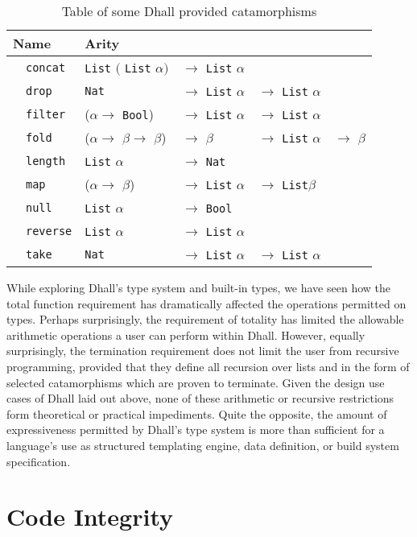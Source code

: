\documentclass[12pt]{diazessay}
\newcommand{\F}[1]
{$\quad$\texttt{#1}
}
\newcommand{\A}{$\alpha$}
\newcommand{\B}{$\beta$}
\newcommand{\Bool   }{\texttt{Bool}}
\newcommand{\Nat    }{\texttt{Nat}}
\newcommand{\List   }{\texttt{List}}
\begin{document}
\begin{table}[h]
		\begin{tabular}{ |l|llll| } 
			\hline
			Name & \multicolumn{4}{l}{Arity} \vline \\
			\hline
			\F{concat} & \List{} $($ \List{} \A $)$ &$\rightarrow$ \List{} \A & & \\
			\F{drop} &  \Nat{} & $\rightarrow$ \List{} \A &$\rightarrow$ \List{} \A & \\
			\F{filter} & (\A $\rightarrow$ \Bool{}) & $\rightarrow$ \List{} \A &$\rightarrow$ \List{} \A & \\
			\F{fold} & (\A $\rightarrow$ \B $\rightarrow$ \B) &$\rightarrow$ \B  & $\rightarrow$ \List{} \A & $\rightarrow$ \B \\
			\F{length} & \List{} \A & $\rightarrow$ \Nat & & \\
			\F{map} & (\A $\rightarrow$ \B) & $\rightarrow$ \List{} \A & $\rightarrow$ \List \B & \\
			\F{null} & \List{} \A & $\rightarrow$ \Bool & & \\
			\F{reverse} & \List{} \A & $\rightarrow$ \List{} \A & & \\
			\F{take} &  \Nat{} & $\rightarrow$ \List{} \A &$\rightarrow$ \List{} \A & \\
			\hline
		\end{tabular}
	\caption{Table of some Dhall provided catamorphisms}
	\label{tab:catamorphisms}
\end{table}

While exploring Dhall's type system and built-in types, we have seen how the total function requirement has dramatically affected the operations permitted on types.
Perhaps surprisingly, the requirement of totality has limited the allowable arithmetic operations a user can perform within Dhall.
However, equally surprisingly, the termination requirement does not limit the user from recursive programming, provided that they define all recursion over lists and in the form of selected catamorphisms which are proven to terminate.
Given the design use cases of Dhall laid out above, none of these arithmetic or recursive restrictions form theoretical or practical impediments.
Quite the opposite, the amount of expressiveness permitted by Dhall's type system is more than sufficient for a language's use as structured templating engine, data definition, or build system specification.

\section*{Code Integrity}
\end{document}
